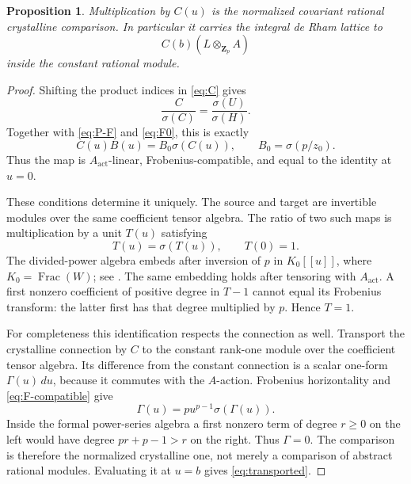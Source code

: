 \documentclass[11pt]{article}
\newtheorem{proposition}[theorem]{Proposition}
\theoremstyle{definition}\newtheorem{definition}[theorem]{Definition}
\theoremstyle{remark}\newtheorem{remark}[theorem]{Remark}
\newcommand{\ZZ}{\mathbf Z}
\newcommand{\act}{\mathrm{act}}
\begin{document}
\begin{proposition}\label{prop:comparison}
Multiplication by $C(u)$ is the normalized covariant rational crystalline comparison. In particular it carries the integral de Rham lattice to
\begin{equation}\label{eq:transported}
 C(b)(L\otimes_{\ZZ_p}A)
\end{equation}
inside the constant rational module.
\end{proposition}

\begin{proof}
Shifting the product indices in \eqref{eq:C} gives
\begin{equation}\label{eq:functional}
 \frac{C}{\sigma(C)}=\frac{\sigma(U)}{\sigma(H)}.
\end{equation}
Together with \eqref{eq:P-F} and \eqref{eq:F0}, this is exactly
\begin{equation}\label{eq:F-compatible}
 C(u)B(u)=B_0\sigma(C(u)),\qquad B_0=\sigma(p/z_0).
\end{equation}
Thus the map is $A_{\act}$-linear, Frobenius-compatible, and equal to the identity at $u=0$.

These conditions determine it uniquely. The source and target are invertible modules over the same coefficient tensor algebra. The ratio of two such maps is multiplication by a unit $T(u)$ satisfying
\[
 T(u)=\sigma(T(u)),\qquad T(0)=1.
\]
The divided-power algebra embeds after inversion of $p$ in $K_0[[u]]$, where $K_0=\operatorname{Frac}(W)$; see \citet[Proposition~7.5, pp.~2250--2251]{Lau}. The same embedding holds after tensoring with $A_{\act}$. A first nonzero coefficient of positive degree in $T-1$ cannot equal its Frobenius transform: the latter first has that degree multiplied by $p$. Hence $T=1$.

For completeness this identification respects the connection as well. Transport the crystalline connection by $C$ to the constant rank-one module over the coefficient tensor algebra. Its difference from the constant connection is a scalar one-form $\Gamma(u)\,du$, because it commutes with the $A$-action. Frobenius horizontality and \eqref{eq:F-compatible} give
\[
 \Gamma(u)=p u^{p-1}\sigma(\Gamma(u)).
\]
Inside the formal power-series algebra a first nonzero term of degree $r\ge0$ on the left would have degree $pr+p-1>r$ on the right. Thus $\Gamma=0$. The comparison is therefore the normalized crystalline one, not merely a comparison of abstract rational modules. Evaluating it at $u=b$ gives \eqref{eq:transported}.
\end{proof}
\end{document}
